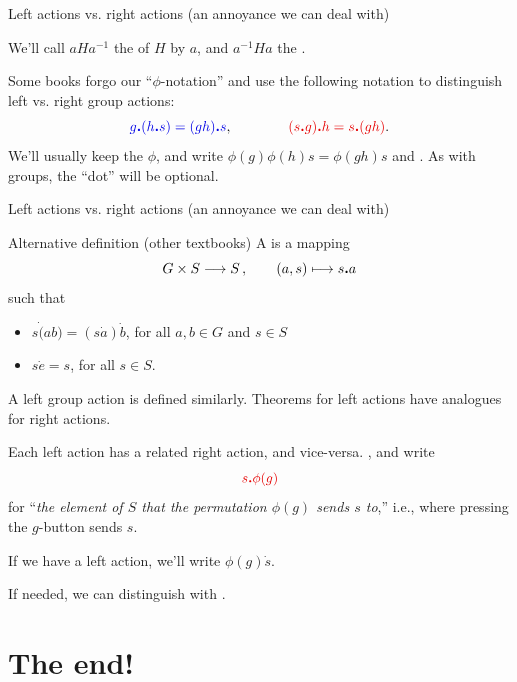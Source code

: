 \documentclass[8pt,handout]{beamer}
\newcommand{\Pause}{}      %
\begin{document}
\begin{frame}{Left actions vs. right actions (an annoyance we can deal with)}
  \Pause %

  We'll call $aHa^{-1}$ the  of $H$ by $a$, and
  $a^{-1}Ha$ the . \medskip\Pause
  
  Some books forgo our ``$\phi$-notation'' and use the following
  notation to distinguish left vs. right group actions:
  \[
    {\color{xBlue}g\Dot(h\Dot s)=(gh)\Dot s},
    \qquad\qquad\Alert{(s\Dot g)\Dot h=s\Dot(gh)}.
  \]
  \Pause We'll usually keep the $\phi$, and write
  {\color{xBlue}$\phi(g)\phi(h)s=\phi(gh)s$} and
  . As with groups, the ``dot''
  will be optional.
  
\end{frame}


\begin{frame}{Left actions vs. right actions (an annoyance we can deal with)} 

  \begin{block}{Alternative definition (other textbooks)}
    A  is a mapping
    \[
    G\times S\longrightarrow S\,,\qquad (a,s)\longmapsto s\bm{.} a
    \]
    \Pause such that 
    \begin{itemize}
    \item $s\Dot(ab)=(s\Dot a)\Dot b$,\; for all $a,b\in G$ and $s\in S$ \Pause
    \item $s\Dot e=s$,\; for all $s\in S$.
    \end{itemize}
  \end{block}

  \medskip\Pause 
  
  A {\color{xBlue}left group action} is defined similarly. Theorems
  for left actions have analogues for right actions.

  \Pause\medskip

  Each left action has a related right action, and vice-versa. \Pause
  , and write
  \[
  \Alert{s\Dot\phi(g)}
  \]
  for ``\emph{the element of $S$ that the permutation $\phi(g)$ sends $s$
  to},'' i.e., where pressing the $g$-button sends $s$.
 
  \Pause\medskip

  If we have a left action, we'll write {\color{xBlue}$\phi(g)\Dot s$}. 

  \Pause\medskip

  If needed, we can distinguish  with
  .


\end{frame}%

\section*{The end!}
\end{document}

